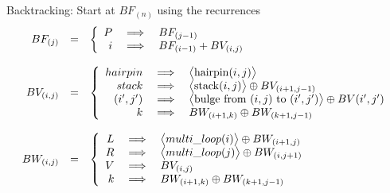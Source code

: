 \item Backtracking: Start at $BF_{(n)}$ using the recurrences
 \[\begin{array}{rcl}
	BF_{(j)} &=& \left\{\begin{array}{rcl} P&\implies& BF_{(j-1)} \\ i &\implies& BF_{(i-1)} + BV_{(i,j)} \end{array} \right.\\
	\\
	BV_{(i,j)} &=& \left\{\begin{array}{rcl}
		hairpin &\implies&\big< {\rm hairpin}(i,j) \big> \\
		stack &\implies& \big< {\rm stack}(i,j) \big> \oplus BV_{(i+1,j-1)} \\
		(i',j') &\implies& \big< \text{bulge from $(i,j)$ to }(i',j') \big> \oplus BV(i',j')\\
		k &\implies& BW_{(i+1,k)} \oplus BW_{(k+1,j-1)}
	\end{array}\right.\\
	\\
	BW_{(i,j)} &=& \left\{\begin{array}{rcl}
	L & \implies & \big< multi\_loop(i) \big> \oplus BW_{(i+1,j)} \\
	R & \implies & \big< multi\_loop(j) \big> \oplus BW_{(i,j+1)} \\
	V &\implies& BV_{(i,j)} \\
	k &\implies& BW_{(i+1,k)} \oplus BW_{(k+1,j-1)}
	\end{array}\right.
\end{array}\]

